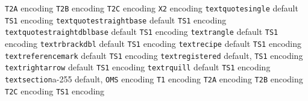 \documentclass[twoside]{ltxdoc}
\makeatletter
\renewenvironment{theindex}{%
   \@restonecoltrue
   \if@twocolumn\@restonecolfalse\fi
   \columnseprule \z@
   \columnsep 35\p@
   \twocolumn[\index@prologue]%
   \IndexParms
   \let\item\@idxitem
   \ignorespaces
}{\if@restonecol\onecolumn\else\clearpage\fi}
\makeatother
\begin{document}
\begin{theindex}
    \subitem \texttt  {T2A} encoding\pfill {}
    \subitem \texttt  {T2B} encoding\pfill {}
    \subitem \texttt  {T2C} encoding\pfill {}
    \subitem \texttt  {X2} encoding\pfill {}
  \item \texttt  {textquotesingle}\efill 
    \subitem default\pfill {}
    \subitem \texttt  {TS1} encoding\pfill {}
  \item \texttt  {textquotestraightbase}\efill 
    \subitem default\pfill {}
    \subitem \texttt  {TS1} encoding\pfill {}
  \item \texttt  {textquotestraightdblbase}\efill 
    \subitem default\pfill {}
    \subitem \texttt  {TS1} encoding\pfill {}
  \item \texttt  {textrangle}\efill 
    \subitem default\pfill {}
    \subitem \texttt  {TS1} encoding\pfill {}
  \item \texttt  {textrbrackdbl}\efill 
    \subitem default\pfill {}
    \subitem \texttt  {TS1} encoding\pfill {}
  \item \texttt  {textrecipe}\efill 
    \subitem default\pfill {}
    \subitem \texttt  {TS1} encoding\pfill {}
  \item \texttt  {textreferencemark}\efill 
    \subitem default\pfill {}
    \subitem \texttt  {TS1} encoding\pfill {}
  \item \texttt  {textregistered}\efill 
    \subitem default\pfill {}, 
    \subitem \texttt  {TS1} encoding\pfill {}
  \item \texttt  {textrightarrow}\efill 
    \subitem default\pfill {}
    \subitem \texttt  {TS1} encoding\pfill {}
  \item \texttt  {textrquill}\efill 
    \subitem default\pfill {}
    \subitem \texttt  {TS1} encoding\pfill {}
  \item \texttt  {textsection}\pfill a-255
    \subitem default\pfill {}, 
    \subitem \texttt  {OMS} encoding\pfill {}
    \subitem \texttt  {T1} encoding\pfill {}
    \subitem \texttt  {T2A} encoding\pfill {}
    \subitem \texttt  {T2B} encoding\pfill {}
    \subitem \texttt  {T2C} encoding\pfill {}
    \subitem \texttt  {TS1} encoding\pfill {}

\end{theindex}
\end{document}
